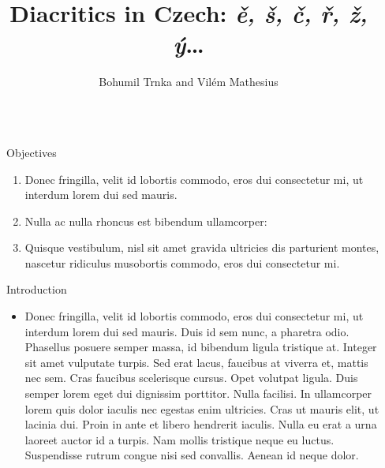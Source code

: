 \documentclass[final,hyperref={pdfpagelabels=false}]{beamer}
\title{Diacritics in Czech: \emph{ě, š, č, ř, ž, ý}\ldots} %
\author{Bohumil Trnka and Vilém Mathesius} %
\institute{Institute of the Czech National Corpus, Faculty of Arts, Charles
  University, Prague} %
\begin{document}
\begin{frame}[t]

\begin{columns}[t] %

\begin{column}{.03\textwidth}\end{column} %

\begin{column}{.465\textwidth} %


\begin{ctblock}{Objectives}

\begin{enumerate}
\item Donec fringilla, velit id lobortis commodo, eros dui consectetur mi, ut interdum lorem dui sed mauris.
\item Nulla ac nulla rhoncus est bibendum ullamcorper:
\item Quisque vestibulum, nisl sit amet gravida ultricies dis parturient montes, nascetur ridiculus musobortis commodo, eros dui consectetur mi.
\end{enumerate}

\end{ctblock}


\begin{ctblock}{Introduction}

\begin{itemize}
\item Donec fringilla, velit id lobortis commodo, eros dui consectetur mi, ut interdum lorem dui sed mauris. Duis id sem nunc, a pharetra odio. Phasellus posuere \alert{semper massa}, id bibendum ligula tristique at. Integer sit amet vulputate turpis. Sed erat lacus, faucibus at viverra et, mattis nec sem. Cras faucibus \alert{scelerisque} cursus. Opet volutpat ligula. Duis semper lorem eget dui dignissim porttitor. Nulla facilisi. In ullamcorper lorem quis dolor iaculis nec egestas enim ultricies. Cras ut mauris elit, ut lacinia dui. Proin in ante et libero hendrerit iaculis. Nulla eu erat a urna laoreet auctor id a turpis. Nam mollis tristique neque eu luctus. Suspendisse rutrum congue nisi sed convallis. Aenean id neque dolor.
\end{itemize}


\end{ctblock}
\end{column}
\end{columns}
\end{frame}
\end{document}
